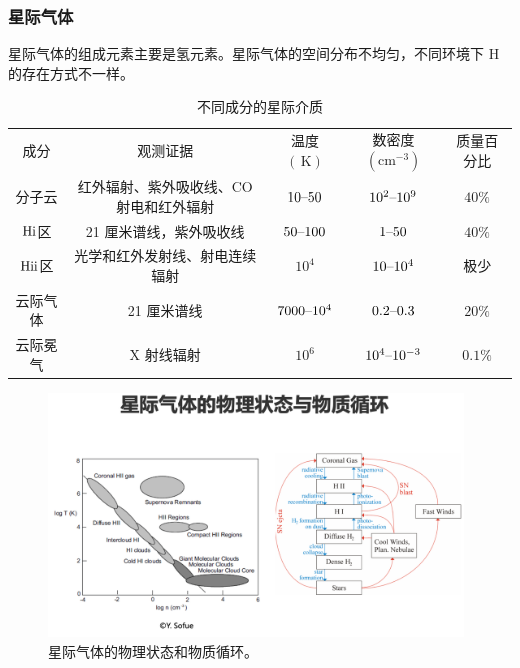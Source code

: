 \documentclass[../天体物理基础.tex]{subfiles}
\begin{document}
\subsubsection{星际气体}
星际气体的组成元素主要是氢元素。星际气体的空间分布不均匀，不同环境下 H 的存在方式不一样。
\begin{table}[!htbp]
\centering
\caption{不同成分的星际介质}
\begin{tabular}{c c c c c}
\hline
成分 & 观测证据 & 温度 $\left(\,\mathrm{K}\right)$ & 数密度$\left(\mathrm{cm^{-3}}\right)$ & 质量百分比\\
\cline{1-5}
分子云 & 红外辐射、紫外吸收线、$\mathrm{CO}$射电和红外辐射 & $10\text{\textendash}50$ & $10^{2}\text{\textendash}10^{9}$ & $40\%$\\
\cline{1-5}
$\mathrm{H\uppercase\expandafter{\romannumeral1}}$区 & 21 厘米谱线，紫外吸收线 & $50\text{\textendash}100$ & $1\text{\textendash}50$ & $40\%$\\
\cline{1-5}
$\mathrm{H\uppercase\expandafter{\romannumeral2}}$区 & 光学和红外发射线、射电连续辐射 & $10^{4}$ & $10\text{\textendash}10^{4}$ & 极少\\
\cline{1-5}
云际气体 & 21 厘米谱线 & $7000\text{\textendash}10^{4}$ & $0.2\text{\textendash}0.3$ & $20\%$\\
\cline{1-5}
云际冕气 & X 射线辐射 & $10^{6}$ & $10^{4}\text{\textendash}10^{-3}$ & $0.1\%$\\
\hline
\end{tabular}
\label{}
\end{table}

\begin{figure}[!htbp]
\centering
\includegraphics[width=11cm]{figures/figure3_1.png}
\captionsetup{justification=raggedright, singlelinecheck=false}
\caption{星际气体的物理状态和物质循环。}
\label{星际气体的物理状态和物质循环。}
\end{figure}
\end{document}
